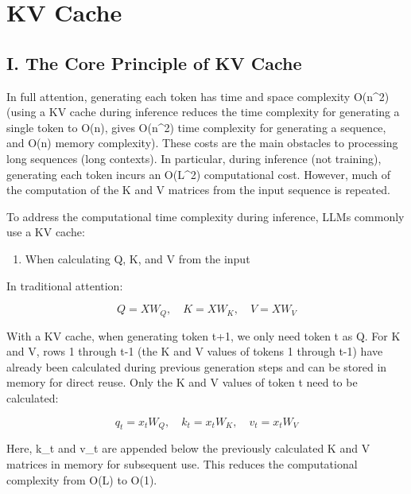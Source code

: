 \setcounter{section}{0}

\hypertarget{kv-cache}{%
\section{KV Cache}\label{kv-cache}}

\hypertarget{i.-the-core-principle-of-kv-cache}{%
\subsection{I. The Core Principle of KV Cache}\label{i.-the-core-principle-of-kv-cache}}

In full attention, generating each token has time and space complexity O(n\^{}2) (using a KV cache during inference reduces the time complexity for generating a single token to O(n), gives O(n\^{}2) time complexity for generating a sequence, and O(n) memory complexity). These costs are the main obstacles to processing long sequences (long contexts). In particular, during inference (not training), generating each token incurs an O(L\^{}2) computational cost. However, much of the computation of the K and V matrices from the input sequence is repeated.

To address the computational time complexity during inference, LLMs commonly use a KV cache:

\begin{enumerate}
\def\labelenumi{\arabic{enumi}.}
\tightlist
\item
  When calculating Q, K, and V from the input
\end{enumerate}

In traditional attention:

\[
Q = XW_Q,\quad K = XW_K,\quad V = XW_V
\]

With a KV cache, when generating token t+1, we only need token t as Q. For K and V, rows 1 through t-1 (the K and V values of tokens 1 through t-1) have already been calculated during previous generation steps and can be stored in memory for direct reuse. Only the K and V values of token t need to be calculated:

\[
q_t = x_tW_Q,\quad k_t = x_tW_K,\quad v_t = x_tW_V
\]

Here, k\_t and v\_t are appended below the previously calculated K and V matrices in memory for subsequent use. This reduces the computational complexity from O(L) to O(1).

